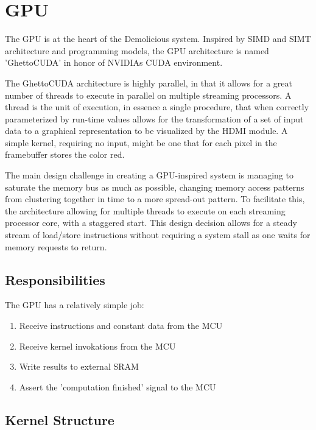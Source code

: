 \chapter{GPU}

The GPU is at the heart of the Demolicious system.
Inspired by SIMD and SIMT architecture and programming models, the GPU architecture is named 'GhettoCUDA' in honor of NVIDIAs CUDA environment.

The GhettoCUDA architecture is highly parallel, in that it allows for a great number of threads to execute in parallel on multiple streaming processors.
A thread is the unit of execution, in essence a single procedure, that when correctly parameterized by run-time values allows for the transformation of a set of input data to a graphical representation to be visualized by the HDMI module.
A simple kernel, requiring no input, might be one that for each pixel in the framebuffer stores the color red.

The main design challenge in creating a GPU-inspired system is managing to saturate the memory bus as much as possible, changing memory access patterns from clustering together in time to a more spread-out pattern.
To facilitate this, the architecture allowing for multiple threads to execute on each streaming processor core, with a staggered start.
This design decision allows for a steady stream of load/store instructions without requiring a system stall as one waits for memory requests to return.

\section{Responsibilities}

The GPU has a relatively simple job:
\begin{enumerate}
  \item
    Receive instructions and constant data from the MCU
  \item
    Receive kernel invokations from the MCU
  \item
    Write results to external SRAM
  \item
    Assert the 'computation finished' signal to the MCU
\end{enumerate}

\section{Kernel Structure}



